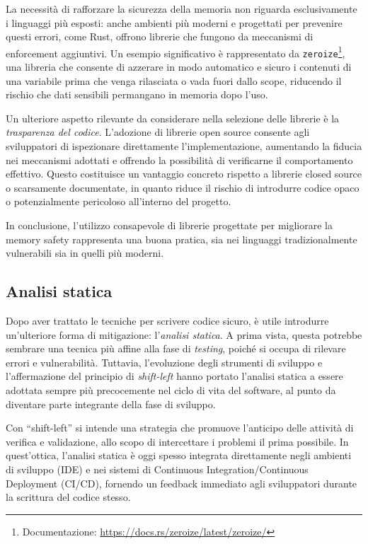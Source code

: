 La necessità di rafforzare la sicurezza della memoria non riguarda esclusivamente
i linguaggi più esposti: anche ambienti più moderni e progettati per prevenire
questi errori, come Rust, offrono librerie che fungono da meccanismi di
enforcement aggiuntivi. Un esempio significativo è rappresentato da \texttt{zeroize}\protect\footnote{Documentazione:
\url{https://docs.rs/zeroize/latest/zeroize/}}, una libreria che consente di azzerare
in modo automatico e sicuro i contenuti di una variabile prima che venga rilasciata
o vada fuori dallo scope, riducendo il rischio che dati sensibili permangano in
memoria dopo l'uso.

Un ulteriore aspetto rilevante da considerare nella selezione delle librerie è
la \textit{trasparenza del codice}. L'adozione di librerie open source consente
agli sviluppatori di ispezionare direttamente l'implementazione, aumentando la fiducia
nei meccanismi adottati e offrendo la possibilità di verificarne il comportamento
effettivo. Questo costituisce un vantaggio concreto rispetto a librerie closed
source o scarsamente documentate, in quanto riduce il rischio di introdurre codice
opaco o potenzialmente pericoloso all'interno del progetto.

In conclusione, l'utilizzo consapevole di librerie progettate per migliorare la
memory safety rappresenta una buona pratica, sia nei linguaggi tradizionalmente vulnerabili
sia in quelli più moderni.

\subsection{Analisi statica}
\label{sec:analisi-statica}

Dopo aver trattato le tecniche per scrivere codice sicuro, è utile introdurre un'ulteriore
forma di mitigazione: l'\textit{analisi statica}. A prima vista, questa potrebbe
sembrare una tecnica più affine alla fase di \textit{testing}, poiché si occupa di
rilevare errori e vulnerabilità. Tuttavia, l'evoluzione degli strumenti di sviluppo
e l'affermazione del principio di \textit{shift-left} hanno portato l'analisi
statica a essere adottata sempre più precocemente nel ciclo di vita del software,
al punto da diventare parte integrante della fase di sviluppo.

Con ``shift-left'' si intende una strategia che promuove l'anticipo delle attività
di verifica e validazione, allo scopo di intercettare i problemi il prima
possibile. In quest'ottica, l'analisi statica è oggi spesso integrata
direttamente negli ambienti di sviluppo (IDE) e nei sistemi di Continuous
Integration/Continuous Deployment (CI/CD), fornendo un feedback immediato agli sviluppatori
durante la scrittura del codice stesso.

